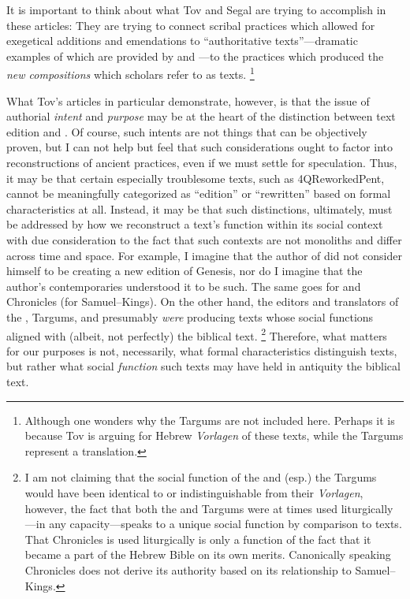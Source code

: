It is important to think about what Tov and Segal are trying to accomplish in these articles: They are trying to connect scribal practices which allowed for exegetical additions and emendations to ``authoritative texts''---dramatic examples of which are provided by \sampent and \lxx---to the practices which produced the \emph{new compositions} which scholars refer to as \rwb texts.%
    \footnote{%
        Although one wonders why the Targums are not included here. Perhaps it is because Tov is arguing for Hebrew \emph{Vorlagen} of these texts, while the Targums represent a translation.}

What Tov's articles in particular demonstrate, however, is that the issue of authorial \emph{intent} and \emph{purpose} may be at the heart of the distinction between text edition and \rwb. Of course, such intents are not things that can be objectively proven, but I can not help but feel that such considerations ought to factor into reconstructions of ancient practices, even if we must settle for speculation. Thus, it may be that certain especially troublesome texts, such as 4QReworkedPent, cannot be meaningfully categorized as ``edition'' or ``rewritten'' based on formal characteristics at all. Instead, it may be that such distinctions, ultimately, must be addressed by how we reconstruct a text's function within its social context with due consideration to the fact that such contexts are not monoliths and differ across time and space. For example, I imagine that the author of \ga did not consider himself to be creating a new edition of Genesis, nor do I imagine that the author's contemporaries understood it to be such. The same goes for \jub and Chronicles (for Samuel--Kings). On the other hand, the editors and translators of the \sampent, Targums, and \lxx presumably \emph{were} producing texts whose social functions aligned with (albeit, not perfectly) the biblical text.%
    \footnote{%
        I am not claiming that the social function of the \lxx and (esp.) the Targums would have been identical to or indistinguishable from their \emph{Vorlagen}, however, the fact that both the \lxx and Targums were at times used liturgically---in any capacity---speaks to a unique social function by comparison to \rwb texts. That Chronicles is used liturgically is only a function of the fact that it became a part of the Hebrew Bible on its own merits. Canonically speaking Chronicles does not derive its authority based on its relationship to Samuel--Kings.}
%
Therefore, what matters for our purposes is not, necessarily, what formal characteristics distinguish \rwb texts, but rather what social \emph{function} such texts may have held in antiquity \visavis the biblical text.

